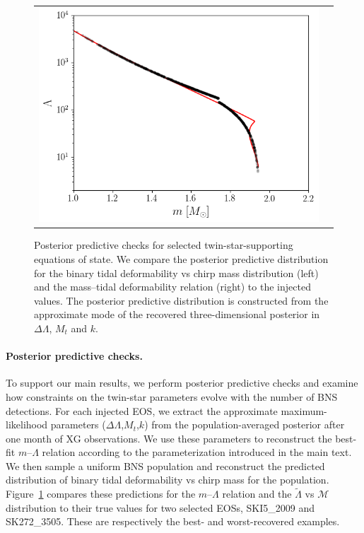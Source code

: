 \documentclass[aps,prl,twocolumn,superscriptaddress,footinbib]{revtex4-1}
\begin{document}
\begin{figure}
\begin{tabular}{cc}
      \includegraphics[width=0.9\columnwidth]{SK2723505_ppd2.png}
    \end{tabular}
    \caption{Posterior predictive checks for selected twin-star-supporting equations of state. We compare the posterior predictive distribution for the binary tidal deformability vs chirp mass distribution (left) and the mass--tidal deformability relation (right) to the injected values. The posterior predictive distribution is constructed from the approximate mode of the recovered three-dimensional posterior in $\Delta\Lambda$, $M_t$ and $k$.}
    \label{fig:ppd}
\end{figure}

\paragraph{Posterior predictive checks.}

To support our main results, we perform posterior predictive checks and examine how constraints on the twin-star parameters evolve with the number of BNS detections. For each injected EOS, we extract the approximate maximum-likelihood parameters ($\Delta\Lambda$,$M_t$,$k$) from the population-averaged posterior after one month of XG observations. We use these parameters to reconstruct the best-fit $m$--$\Lambda$ relation according to the parameterization introduced in the main text. We then sample a uniform BNS population and reconstruct the predicted distribution of binary tidal deformability vs chirp mass for the population. Figure~\ref{fig:ppd} compares these predictions for the $m$--$\Lambda$ relation and the $\tilde{\Lambda}$ vs $\mathcal{M}$ distribution to their true values for two selected EOSs, SKI5\_2009 and SK272\_3505. These are respectively the best- and worst-recovered examples.
\end{document}
